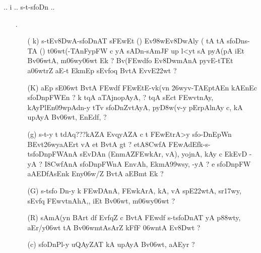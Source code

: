 \begin{center}
{\dn .. i .. s\2-t{\rs -\re}s\2foDn ..}
\end{center}

\begin{itemize}

\item[{\dn \dnnum \rn{23}}.] \begin{itemize}
           
           \item[( {\dn k})] {\dn s\2-tEv\38DwA{\rs -\re}s\2foDnAT{\rdt} s\2\3FEwEt {\rs (\re}{\dn \dnnum {}}{\rs )\re} Ev\398wEv\38DwAly\? {\rs (\re}{\dn\dnnum {}} tA tA s\2foDns\2-TA {\rs (\re}{\dn\dnnum {}}{\rs )\re} t\306wt(-TAnFy\-pFW\? c yA sADn{\rs -\re}sAmJF up\- l<yt\?{\rs ,\re} sA pyA\0(pA iEt Bv\306wtA, m\306wy\306wt\? Ek {\rs ?\re} Bv(\3FEwd\?fo Ev\38DwmAnA\2 py\0vE-tTEt a\306wtr\?Z aE-t EkmEp sEvfoq\2 BvtA\2 EvvE\322wt {\rs ?\re}} 

           \item[({\dn K})] {\dn aEp sE\306wt BvtA\2 \3FEwd\?f\? \3FEwEtE-vk(v\?n \326wyv-TAEptAEn kAEnEc s\2foDnpFWEn {\rs ?\re} k\? t\?qA aTA\0j\0no\-pAyA, {\rs ?\re} t\?qA\2 sEct\2 \3FEwvt\0{\rs -\re}nAy{\rs ,\re} kAy\0PlEn\309wpAd\-n-y tT\4v s\2foDnZvtAyA, py\0\3D8w(v-y pErpAlnAy c{\rs ,\re} kA upAyA Bv\306wt, EnEd\2f\?, {\rs ?\re}}
           
           \item[({\dn g})] {\dn s\2-t-y t\? tdAq{\rs ???\re}kAZA\2 EvqyAZA\2 c t\? \3FEwEtrA>y\2 s\2fo{\rs -\re}DnEpW\?n BEvt\326wyaAErt vA et BvtA\2 gt {\rs ?\re} etA\38CwfA\2  \3FEwAd\?Efk{\rs -\re}s\2-ts\2foDnpFWAnA\2 s\2EvDAn\2 {\rs (\re}EnmA\0Z\3FEwkAr, vA{\rs ),\re} yojnA{\rs ,\re} kAy\0 c Ek\2EvD\2 -yA {\rs ?\re} I\38CwfAnA\2 s\2foDnpFWnA\2 EnvA\0h, EkmA\399wsy, -yA {\rs ?\re} e s\2foDnpFW\? aAEDfAsEnk\2 Eny\306w/Z\2 BvtA aEBmt\2 Ek {\rs ?\re}}

          \item[({\dn G})] {\dn s\2-ts\2fo Dn-y k\? \3FEwDAnA, \3FEwkArA, kA, vA sp\?E\322wtA, sr\317wy, sEvf\?{\qva}q \3FEwvt\0nAhA\0,{\rs ,\re} iEt Bv\306wt, m\306wy\306wt\? {\rs ?\re}}
          
          \item[({\dn R})] {\dn sAmA(y\?n BArt\? d\?f\?{\rs ,\re} Evf\?q\?Z c BvtA\2 \3FEwd\?f\?{\rs ,\re} s\2-ts\2foDnAT{\rdt} yA\2 p\388wty, aEr/y\306wt\?{\rs ,\re} tA   Bv\306wmtAsAr\?Z kFfF \306wntA Ev\38Dwt\? {\rs ?\re}}
          
          \item[({\dn c})] {\dn s\2foDnPl-y uQAyZAT{\rdt} kA upAyA Bv\306wt, aAEy\?r {\rs ?\re}}
          
          \end{itemize}
\end{itemize}

